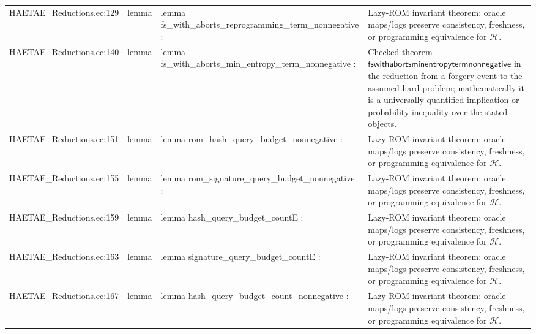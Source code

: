 \documentclass[10pt]{article}
\begin{document}
\begin{longtable}{L{0.11\textwidth}L{0.055\textwidth}L{0.385\textwidth}L{0.41\textwidth}}
HAETAE\_\allowbreak{}Reductions.\allowbreak{}ec:\allowbreak{}129 & lemma & {\ttfamily\scriptsize lemma fs\_\allowbreak{}with\_\allowbreak{}aborts\_\allowbreak{}reprogramming\_\allowbreak{}term\_\allowbreak{}nonnegative :} & Lazy-ROM invariant theorem: oracle maps/logs preserve consistency, freshness, or programming equivalence for $\mathcal H$. \\
HAETAE\_\allowbreak{}Reductions.\allowbreak{}ec:\allowbreak{}140 & lemma & {\ttfamily\scriptsize lemma fs\_\allowbreak{}with\_\allowbreak{}aborts\_\allowbreak{}min\_\allowbreak{}entropy\_\allowbreak{}term\_\allowbreak{}nonnegative :} & Checked theorem $\mathsf{fswithabortsminentropytermnonnegative}$ in the reduction from a forgery event to the assumed hard problem; mathematically it is a universally quantified implication or probability inequality over the stated objects. \\
HAETAE\_\allowbreak{}Reductions.\allowbreak{}ec:\allowbreak{}151 & lemma & {\ttfamily\scriptsize lemma rom\_\allowbreak{}hash\_\allowbreak{}query\_\allowbreak{}budget\_\allowbreak{}nonnegative :} & Lazy-ROM invariant theorem: oracle maps/logs preserve consistency, freshness, or programming equivalence for $\mathcal H$. \\
HAETAE\_\allowbreak{}Reductions.\allowbreak{}ec:\allowbreak{}155 & lemma & {\ttfamily\scriptsize lemma rom\_\allowbreak{}signature\_\allowbreak{}query\_\allowbreak{}budget\_\allowbreak{}nonnegative :} & Lazy-ROM invariant theorem: oracle maps/logs preserve consistency, freshness, or programming equivalence for $\mathcal H$. \\
HAETAE\_\allowbreak{}Reductions.\allowbreak{}ec:\allowbreak{}159 & lemma & {\ttfamily\scriptsize lemma hash\_\allowbreak{}query\_\allowbreak{}budget\_\allowbreak{}countE :} & Lazy-ROM invariant theorem: oracle maps/logs preserve consistency, freshness, or programming equivalence for $\mathcal H$. \\
HAETAE\_\allowbreak{}Reductions.\allowbreak{}ec:\allowbreak{}163 & lemma & {\ttfamily\scriptsize lemma signature\_\allowbreak{}query\_\allowbreak{}budget\_\allowbreak{}countE :} & Lazy-ROM invariant theorem: oracle maps/logs preserve consistency, freshness, or programming equivalence for $\mathcal H$. \\
HAETAE\_\allowbreak{}Reductions.\allowbreak{}ec:\allowbreak{}167 & lemma & {\ttfamily\scriptsize lemma hash\_\allowbreak{}query\_\allowbreak{}budget\_\allowbreak{}count\_\allowbreak{}nonnegative :} & Lazy-ROM invariant theorem: oracle maps/logs preserve consistency, freshness, or programming equivalence for $\mathcal H$. \\

\end{longtable}
\end{document}

